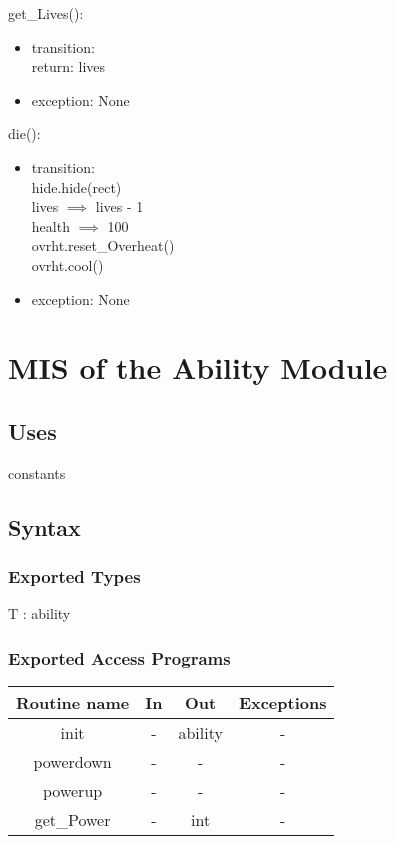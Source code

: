\documentclass[12pt, titlepage]{article}
\begin{document}
\noindent get\_Lives(): 
\begin{itemize}
\item transition:\\
return: lives\\
\item exception: None\\
\end{itemize}

\noindent die(): 
\begin{itemize}
\item transition:\\
hide.hide(rect)\\
lives $\implies$ lives - 1\\
health $\implies$ 100\\
ovrht.reset\_Overheat()\\
ovrht.cool()\\
\item exception: None\\
\end{itemize}

\section {MIS of the Ability Module}

\subsection {Uses}

constants

\subsection {Syntax}

\subsubsection {Exported Types}
T : ability
\subsubsection {Exported Access Programs}

\begin{tabular}{| c | c | c | c |}
\hline
\textbf{Routine name} & \textbf{In} & \textbf{Out} & \textbf{Exceptions}\\
\hline
init & - & ability & -  \\
\hline
powerdown & - & - & -\\
\hline
powerup & - & - & -\\
\hline 
get\_Power & - & int & -\\
\hline
\end{tabular}
\end{document}
